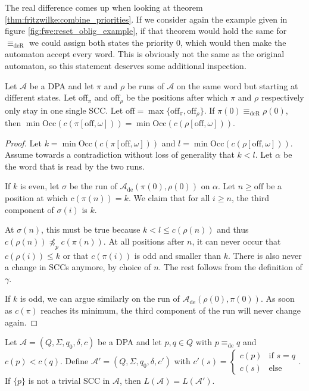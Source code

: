 The real difference comes up when looking at theorem \ref{thm:fritzwilke:combine_priorities}. If we consider again the example given in figure \ref{fig:fwe:reset_oblig_example}, if that theorem would hold the same for $\equiv_\text{deR}$ we could assign both states the priority $0$, which would then make the automaton accept every word. This is obviously not the same as the original automaton, so this statement deserves some additional inspection.

\begin{lem}
\label{lem:fwe:deR_equiv_states_same_minpri}
	Let $\mathcal{A}$ be a DPA and let $\pi$ and $\rho$ be runs of $\mathcal{A}$ on the same word but starting at different states.
	Let $\text{off}_\pi$ and $\text{off}_\rho$ be the positions after which $\pi$ and $\rho$ respectively only stay in one single SCC. Let $\text{off} = \max \{\text{off}_\pi, \text{off}_\rho\}$. If $\pi(0) \equiv_\text{deR} \rho(0)$, then $\min \text{Occ}(c(\pi[\text{off},\omega])) = \min \text{Occ}(c(\rho[\text{off},\omega]))$.
\end{lem}

\begin{proof}
	Let $k = \min \text{Occ}(c(\pi[\text{off},\omega]))$ and $l = \min \text{Occ}(c(\rho[\text{off},\omega]))$. Assume towards a contradiction without loss of generality that $k < l$. Let $\alpha$ be the word that is read by the two runs.
	
	If $k$ is even, let $\sigma$ be the run of $\mathcal{A}_\text{de}(\pi(0), \rho(0))$ on $\alpha$. Let $n \geq \text{off}$ be a position at which $c(\pi(n)) = k$. We claim that for all $i \geq n$, the third component of $\sigma(i)$ is $k$.
	
	At $\sigma(n)$, this must be true because $k < l \leq c(\rho(n))$ and thus $c(\rho(n)) \not\preceq_p c(\pi(n))$. At all positions after $n$, it can never occur that $c(\rho(i)) \leq k$ or that $c(\pi(i))$ is odd and smaller than $k$. There is also never a change in SCCs anymore, by choice of $n$. The rest follows from the definition of $\gamma$.
	
	If $k$ is odd, we can argue similarly on the run of $\mathcal{A}_\text{de}(\rho(0), \pi(0))$. As soon as $c(\pi)$ reaches its minimum, the third component of the run will never change again.
\end{proof}

\begin{theorem} %
\label{thm:fwe:deR_combine_priorities}
	Let $\mathcal{A} = (Q, \Sigma, q_0, \delta, c)$ be a DPA and let $p, q \in Q$ with $p \equiv_\text{de} q$ and $c(p) < c(q)$. Define $\mathcal{A}' = (Q, \Sigma, q_0, \delta, c')$ with $c'(s) = \begin{cases} c(p) & \text{if } s = q \\ c(s) & \text{else} \end{cases}$. If $\{p\}$ is not a trivial SCC in $\mathcal{A}$, then $L(\mathcal{A}) = L(\mathcal{A}')$.
\end{theorem}

